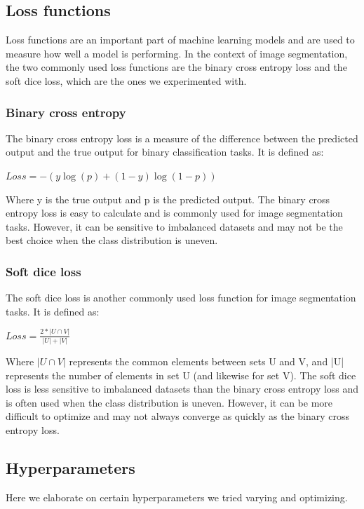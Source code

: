 \documentclass[10pt,conference,compsocconf]{IEEEtran}
\begin{document}
\subsection{Loss functions}
Loss functions are an important part of machine learning models and are used to measure how well a model is performing. In the context of image segmentation, the two commonly used loss functions are the binary cross entropy loss and the soft dice loss, which are the ones we experimented with.
\subsubsection{Binary cross entropy}
The binary cross entropy loss is a measure of the difference between the predicted output and the true output for binary classification tasks. It is defined as:
\begin{center}
$Loss = -{(y\log(p) + (1 - y)\log(1 - p))}$
\end{center}

Where y is the true output and p is the predicted output. The binary cross entropy loss is easy to calculate and is commonly used for image segmentation tasks. However, it can be sensitive to imbalanced datasets and may not be the best choice when the class distribution is uneven.
\subsubsection{Soft dice loss}
The soft dice loss is another commonly used loss function for image segmentation tasks. It is defined as:
\begin{center}
$Loss = \frac{2*|U \cap V|}{|U| + |V|}$
\end{center}
Where ${|U \cap V|}$ represents the common elements between sets U and V, and |U| represents the number of elements in set U (and likewise for set V). The soft dice loss is less sensitive to imbalanced datasets than the binary cross entropy loss and is often used when the class distribution is uneven. However, it can be more difficult to optimize and may not always converge as quickly as the binary cross entropy loss.
\subsection{Hyperparameters}
Here we elaborate on certain hyperparameters we tried varying and optimizing.
\end{document}
